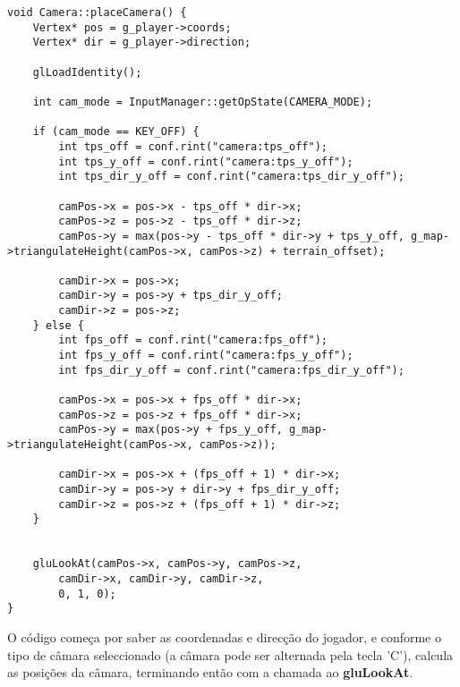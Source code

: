 \begin{lstlisting}[caption=Função de posicionamento da câmara]
void Camera::placeCamera() {
	Vertex* pos = g_player->coords;
	Vertex* dir = g_player->direction;

	glLoadIdentity();

	int cam_mode = InputManager::getOpState(CAMERA_MODE);

	if (cam_mode == KEY_OFF) {
		int tps_off = conf.rint("camera:tps_off");
		int tps_y_off = conf.rint("camera:tps_y_off");
		int tps_dir_y_off = conf.rint("camera:tps_dir_y_off");

		camPos->x = pos->x - tps_off * dir->x;
		camPos->z = pos->z - tps_off * dir->z;
		camPos->y = max(pos->y - tps_off * dir->y + tps_y_off, g_map->triangulateHeight(camPos->x, camPos->z) + terrain_offset);

		camDir->x = pos->x;
		camDir->y = pos->y + tps_dir_y_off;
		camDir->z = pos->z;
	} else {
		int fps_off = conf.rint("camera:fps_off");
		int fps_y_off = conf.rint("camera:fps_y_off");
		int fps_dir_y_off = conf.rint("camera:fps_dir_y_off");

		camPos->x = pos->x + fps_off * dir->x;
		camPos->z = pos->z + fps_off * dir->x;
		camPos->y = max(pos->y + fps_y_off, g_map->triangulateHeight(camPos->x, camPos->z));

		camDir->x = pos->x + (fps_off + 1) * dir->x;
		camDir->y = pos->y + dir->y + fps_dir_y_off;
		camDir->z = pos->z + (fps_off + 1) * dir->z;
	}


	gluLookAt(camPos->x, camPos->y, camPos->z,
		camDir->x, camDir->y, camDir->z,
		0, 1, 0);
}

\end{lstlisting} 

O código começa por saber as coordenadas e direcção do jogador, e conforme o tipo de câmara seleccionado (a câmara pode ser alternada pela tecla 'C'), calcula as posições da câmara, terminando então com a chamada ao \textbf{gluLookAt}.
